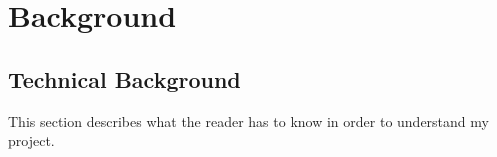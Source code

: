 \section{Background} 
\subsection{Technical Background}
This section describes what the reader has to know in order to understand my project.